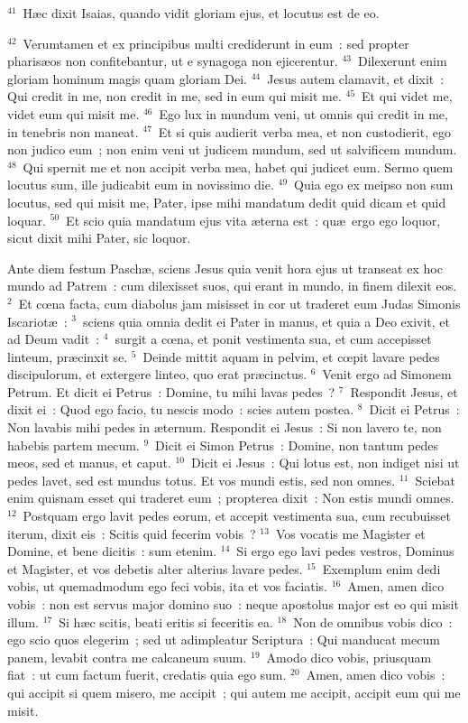 ${}^{41}$~H\ae c dixit Isaias, quando vidit gloriam ejus, et locutus est de eo.


${}^{42}$~Verumtamen et ex principibus multi crediderunt in eum~: sed propter pharis\ae os non confitebantur, ut e synagoga non ejicerentur.
${}^{43}$~Dilexerunt enim gloriam hominum magis quam gloriam Dei.
${}^{44}$~Jesus autem clamavit, et dixit~: Qui credit in me, non credit in me, sed in eum qui misit me.
${}^{45}$~Et qui videt me, videt eum qui misit me.
${}^{46}$~Ego lux in mundum veni, ut omnis qui credit in me, in tenebris non maneat.
${}^{47}$~Et si quis audierit verba mea, et non custodierit, ego non judico eum~; non enim veni ut judicem mundum, sed ut salvificem mundum.
${}^{48}$~Qui spernit me et non accipit verba mea, habet qui judicet eum. Sermo quem locutus sum, ille judicabit eum in novissimo die.
${}^{49}$~Quia ego ex meipso non sum locutus, sed qui misit me, Pater, ipse mihi mandatum dedit quid dicam et quid loquar.
${}^{50}$~Et scio quia mandatum ejus vita \ae terna est~: qu\ae\ ergo ego loquor, sicut dixit mihi Pater, sic loquor.

\lettrine[lines=3,image=true,loversize=0.05,lraise=-0.03]{A}{}nte diem festum Pasch\ae , sciens Jesus quia venit hora ejus ut transeat ex hoc mundo ad Patrem~: cum dilexisset suos, qui erant in mundo, in finem dilexit eos.
${}^{2}$~Et cœna facta, cum diabolus jam misisset in cor ut traderet eum Judas Simonis Iscariot\ae~:
${}^{3}$~sciens quia omnia dedit ei Pater in manus, et quia a Deo exivit, et ad Deum vadit~:
${}^{4}$~surgit a cœna, et ponit vestimenta sua, et cum accepisset linteum, pr\ae cinxit se.
${}^{5}$~Deinde mittit aquam in pelvim, et cœpit lavare pedes discipulorum, et extergere linteo, quo erat pr\ae cinctus.
${}^{6}$~Venit ergo ad Simonem Petrum. Et dicit ei Petrus~: Domine, tu mihi lavas pedes~?
${}^{7}$~Respondit Jesus, et dixit ei~: Quod ego facio, tu nescis modo~: scies autem postea.
${}^{8}$~Dicit ei Petrus~: Non lavabis mihi pedes in \ae ternum. Respondit ei Jesus~: Si non lavero te, non habebis partem mecum.
${}^{9}$~Dicit ei Simon Petrus~: Domine, non tantum pedes meos, sed et manus, et caput.
${}^{10}$~Dicit ei Jesus~: Qui lotus est, non indiget nisi ut pedes lavet, sed est mundus totus. Et vos mundi estis, sed non omnes.
${}^{11}$~Sciebat enim quisnam esset qui traderet eum~; propterea dixit~: Non estis mundi omnes.
${}^{12}$~Postquam ergo lavit pedes eorum, et accepit vestimenta sua, cum recubuisset iterum, dixit eis~: Scitis quid fecerim vobis~?
${}^{13}$~Vos vocatis me Magister et Domine, et bene dicitis~: sum etenim.
${}^{14}$~Si ergo ego lavi pedes vestros, Dominus et Magister, et vos debetis alter alterius lavare pedes.
${}^{15}$~Exemplum enim dedi vobis, ut quemadmodum ego feci vobis, ita et vos faciatis.
${}^{16}$~Amen, amen dico vobis~: non est servus major domino suo~: neque apostolus major est eo qui misit illum.
${}^{17}$~Si h\ae c scitis, beati eritis si feceritis ea.
${}^{18}$~Non de omnibus vobis dico~: ego scio quos elegerim~; sed ut adimpleatur Scriptura~: Qui manducat mecum panem, levabit contra me calcaneum suum.
${}^{19}$~Amodo dico vobis, priusquam fiat~: ut cum factum fuerit, credatis quia ego sum.
${}^{20}$~Amen, amen dico vobis~: qui accipit si quem misero, me accipit~; qui autem me accipit, accipit eum qui me misit.



